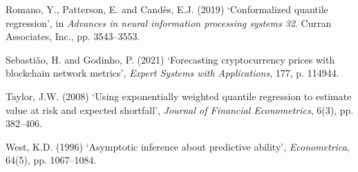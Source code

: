 \documentclass[
  a4paper,
  DIV=11,
  numbers=noendperiod]{scrreprt}
\newlength{\cslhangindent}
\newenvironment{CSLReferences}[2] %
 {\begin{list}{}{%
  \setlength{\itemindent}{0pt}
  \setlength{\leftmargin}{0pt}
  \setlength{\parsep}{0pt}
  \ifodd #1
   \setlength{\leftmargin}{\cslhangindent}
   \setlength{\itemindent}{-1\cslhangindent}
  \fi
  \setlength{\itemsep}{#2\baselineskip}}}
 {\end{list}}
\begin{document}
\begin{CSLReferences}{0}{1}
Romano, Y., Patterson, E. and Candès, E.J. (2019) {`Conformalized
quantile regression'}, in \emph{Advances in neural information
processing systems 32}. Curran Associates, Inc., pp. 3543--3553.

Sebastião, H. and Godinho, P. (2021) {`Forecasting cryptocurrency prices
with blockchain network metrics'}, \emph{Expert Systems with
Applications}, 177, p. 114944.

Taylor, J.W. (2008) {`Using exponentially weighted quantile regression
to estimate value at risk and expected shortfall'}, \emph{Journal of
Financial Econometrics}, 6(3), pp. 382--406.

West, K.D. (1996) {`Asymptotic inference about predictive ability'},
\emph{Econometrica}, 64(5), pp. 1067--1084.

\end{CSLReferences}
\end{document}
